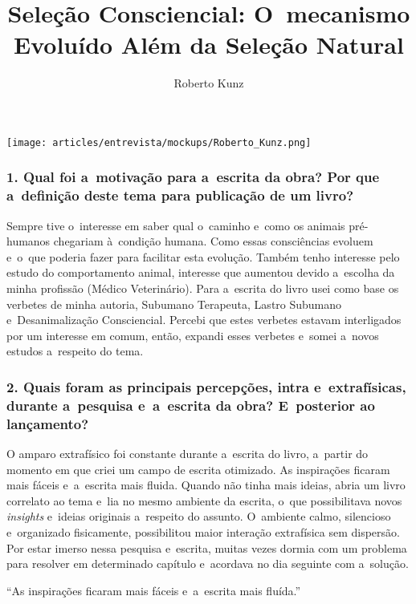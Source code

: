 \documentclass{gescons}
\author{Roberto Kunz}
\title{Seleção Consciencial: O~mecanismo Evoluído Além da Seleção Natural}
\begin{document}
    \makeentrevistatitle

    \begin{multicols}{2}

\begin{center}
    \texttt{[image: articles/entrevista/mockups/Roberto\_Kunz.png]}
\end{center}


\subsubsection{1. Qual foi a~motivação para a~escrita da obra? Por que a~definição deste tema para publicação de um livro?}

Sempre tive o~interesse em saber qual o~caminho e~como os animais pré-humanos chegariam à~condição humana. Como essas consciências evoluem e~o~que poderia fazer para facilitar esta evolução. Também tenho interesse pelo estudo do comportamento animal, interesse que aumentou devido a~escolha da minha profissão (Médico Veterinário). Para a~escrita do livro usei como base os verbetes de minha autoria, Subumano Terapeuta, Lastro Subumano e~Desanimalização Consciencial. Percebi que estes verbetes estavam interligados por um interesse em comum, então, expandi esses verbetes e~somei a~novos estudos a~respeito do tema.

\subsubsection{2. Quais foram as principais percepções, intra e~extrafísicas, durante a~pesquisa e~a~escrita da obra? E~posterior ao lançamento?}

O amparo extrafísico foi constante durante a~escrita do livro, a~partir do momento em que criei um campo de escrita otimizado. As inspirações ficaram mais fáceis e~a~escrita mais fluida. Quando não tinha mais ideias, abria um livro correlato ao tema e~lia no mesmo ambiente da escrita, o~que possibilitava novos \emph{insights} e~ideias originais a~respeito do assunto. O~ambiente calmo, silencioso e~organizado fisicamente, possibilitou maior interação extrafísica sem dispersão. Por estar imerso nessa pesquisa e~escrita, muitas vezes dormia com um problema para resolver em determinado capítulo e~acordava no dia seguinte com a~solução.

\begin{pullquote}
    ``As inspirações ficaram mais fáceis e~a~escrita mais fluída.''
\end{pullquote}


\end{multicols}
\end{document}
